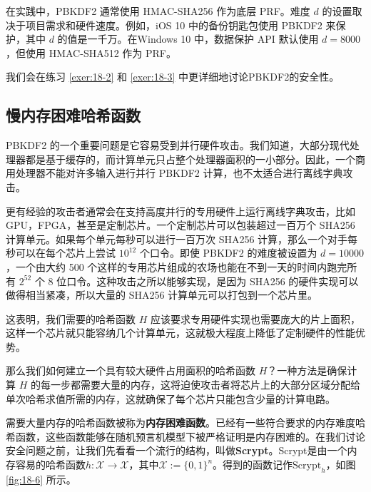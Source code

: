 在实践中，PBKDF2 通常使用 HMAC-SHA256 作为底层 PRF。难度 $d$ 的设置取决于项目需求和硬件速度。例如，iOS 10 中的备份钥匙包使用 PBKDF2 来保护，其中 $d$ 的值是一千万。在Windows 10 中，数据保护 API 默认使用 $d = 8000$，但使用 HMAC-SHA512 作为 PRF。

我们会在练习 \ref{exer:18-2} 和 \ref{exer:18-3} 中更详细地讨论PBKDF2的安全性。

\subsection{慢内存困难哈希函数}

PBKDF2 的一个重要问题是它容易受到并行硬件攻击。我们知道，大部分现代处理器都是基于缓存的，而计算单元只占整个处理器面积的一小部分。因此，一个商用处理器不能对许多输入进行并行 PBKDF2 计算，也不太适合进行离线字典攻击。

更有经验的攻击者通常会在支持高度并行的专用硬件上运行离线字典攻击，比如 GPU，FPGA，甚至是定制芯片。一个定制芯片可以包装超过一百万个 SHA256 计算单元。如果每个单元每秒可以进行一百万次 SHA256 计算，那么一个对手每秒可以在每个芯片上尝试 $10^{12}$ 个口令。即使 PBKDF2 的难度被设置为 $d=10000$，一个由大约 500 个这样的专用芯片组成的农场也能在不到一天的时间内跑完所有 $2^{52}$ 个 8 位口令。这种攻击之所以能够实现，是因为 SHA256 的硬件实现可以做得相当紧凑，所以大量的 SHA256 计算单元可以打包到一个芯片里。

这表明，我们需要的哈希函数 $H$ 应该要求专用硬件实现也需要庞大的片上面积，这样一个芯片就只能容纳几个计算单元，这就极大程度上降低了定制硬件的性能优势。

那么我们如何建立一个具有较大硬件占用面积的哈希函数 $H$？一种方法是确保计算 $H$ 的每一步都需要大量的内存，这将迫使攻击者将芯片上的大部分区域分配给单次哈希求值所需的内存，这就确保了每个芯片只能包含少量的计算电路。

需要大量内存的哈希函数被称为\textbf{内存困难函数}。已经有一些符合要求的内存难度哈希函数，这些函数能够在随机预言机模型下被严格证明是内存困难的。在我们讨论安全问题之前，让我们先看看一个流行的结构，叫做\textbf{Scrypt}。Scrypt是由一个内存容易的哈希函数$h:\mathcal{X}\rightarrow\mathcal{X}$，其中$\mathcal{X}:=\{0,1\}^n$。得到的函数记作$\text{Scrypt}_h$，如图 \ref{fig:18-6} 所示。

